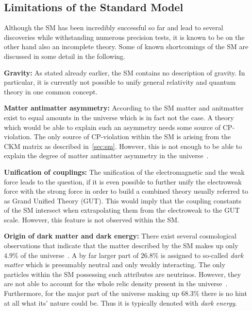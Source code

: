 \subsection{Limitations of the Standard Model}
\label{subsec:sm_shortcomings}
Although the SM has been incredibly successful so far and lead to several discoveries while withstanding numerous precision tests, it is known to be on the other hand also an incomplete theory. Some of known shortcomings of the SM are discussed in some detail in the following.
\begin{description}
\item \textbf{Gravity:} As stated already earlier, the SM contains no description of gravity. In particular, it is currently not possible to unify general relativity and quantum theory in one common concept.
\item \textbf{Matter antimatter asymmetry:} According to the SM matter and anitmatter exist to equal amounts in the universe which is in fact not the case. A theory which would be able to explain such an asymmetry needs some source of CP-violation. The only source of CP-violation within the SM is arising from the CKM matrix as described in~\ref{sec:sm}. However, this is not enough to be able to explain the degree of matter antimatter asymmetry in the universe~\cite{bib:CPViolation}.    
\item \textbf{Unification of couplings:} The unification of the electromagnetic and the weak force leads to the question, if it is even possible to further unify the electroweak force with the strong force in order to build a combined theory usually referred to as Grand Unified Theory (GUT). This would imply that the coupling constants of the SM intersect when extrapolating them from the electroweak to the GUT scale. However, this feature is not observed within the SM.
\item \textbf{Origin of dark matter and dark energy:} There exist several cosmological observations that indicate that the matter described by the SM makes up only $4.9$\% of the universe~\cite{Ade:2013zuv}. A by far larger part of $26.8$\% is assigned to so-called \textit{dark matter} which is presumably neutral and only weakly interacting. The only particles within the SM possessing such attributes are neutrinos. However, they are not able to account for the whole relic density present in the universe~\cite{Bertone:2004pz}. Furthermore, for the major part of the universe making up $68.3$\% there is no hint at all what its' nature could be. Thus it is typically denoted with \textit{dark energy}.    

\end{description}
